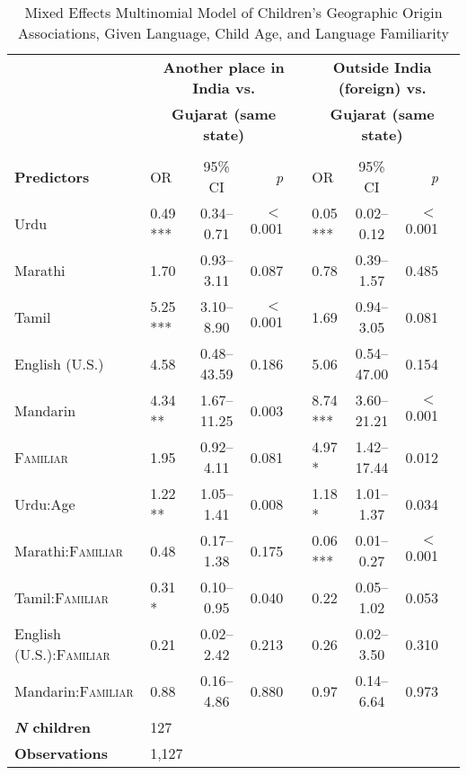 \begin{table*}[t]
\small
\caption{Mixed Effects Multinomial Model of Children's Geographic Origin Associations, Given Language, Child Age, and Language Familiarity}\label{tab:geoidmod}
    \centering
    \vspace{5pt}
\begin{threeparttable}
\begin{tabular}{llcrclcrc}
 \toprule
& \multicolumn{4}{c}{\textbf{Another place in India vs.}} & \multicolumn{4}{c}{\textbf{Outside India (foreign) vs.}}\\
 & \multicolumn{4}{c}{\textbf{Gujarat (same state)\tnote{a}}} & \multicolumn{4}{c}{\textbf{Gujarat (same state)\tnote{a}}}\\
\cline{2-4} \cline{6-8}\\[-.75em]
\textbf{Predictors}\tnote{b} & {OR} & {95\% CI} & \textit{p} & & {OR} & {95\% CI} & \textit{p} & \\ 
\midrule
Urdu & 0.49 *** & 0.34--0.71 & $<$0.001 &  & 0.05 *** & 0.02--0.12 & $<$0.001 \\
Marathi & 1.70 & 0.93--3.11 & 0.087 &  & 0.78 & 0.39--1.57 & 0.485 \\
Tamil & 5.25 *** & 3.10--8.90 & $<$0.001 &  & 1.69 & 0.94--3.05 & 0.081 \\
English (U.S.) & 4.58 & 0.48--43.59 & 0.186 &  & 5.06 & 0.54--47.00 & 0.154 \\
Mandarin & 4.34 ** & 1.67--11.25 & 0.003 &  & 8.74 *** & 3.60--21.21 & $<$0.001 \\
\textsc{Familiar} & 1.95 & 0.92--4.11 & 0.081 &  & 4.97 * & 1.42--17.44 & 0.012 \\
Urdu:Age\tnote{c} & 1.22 ** & 1.05--1.41 & 0.008 &  & 1.18 * & 1.01--1.37 & 0.034 \\
Marathi:\textsc{Familiar} & 0.48 & 0.17--1.38 & 0.175 &  & 0.06 *** & 0.01--0.27 & $<$0.001 \\
Tamil:\textsc{Familiar} & 0.31 * & 0.10--0.95 & 0.040 &  & 0.22 & 0.05--1.02 & 0.053 \\
English (U.S.):\textsc{Familiar} & 0.21 & 0.02--2.42 & 0.213 &  & 0.26 & 0.02--3.50 & 0.310 \\
Mandarin:\textsc{Familiar} & 0.88 & 0.16--4.86 & 0.880 &  & 0.97 & 0.14--6.64 & 0.973 \\
\midrule
\bfseries{\textit{N} children}\tnote{d} & 127 & & & & & & \\ 
\textbf{Observations}\tnote{e} & 1,127 & & & & & & & \\ 

\end{tabular}
\end{threeparttable}
\end{table*}
